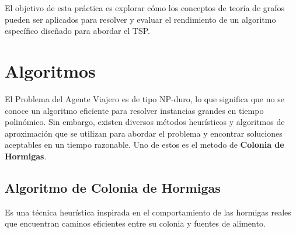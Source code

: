 \documentclass[]{report}
\begin{document}
	El objetivo de esta práctica es explorar cómo los conceptos de teoría de grafos pueden ser aplicados para resolver y evaluar el rendimiento de un algoritmo específico diseñado para abordar el TSP.
	\section{Algoritmos}
	El Problema del Agente Viajero es de tipo NP-duro, lo que significa que no se conoce un algoritmo eficiente para resolver instancias grandes en tiempo polinómico. Sin embargo, existen diversos métodos heurísticos y algoritmos de aproximación que se utilizan para abordar el problema y encontrar soluciones aceptables en un tiempo razonable. Uno de estos es el metodo de \textbf{Colonia de Hormigas}.
	
	\subsection{Algoritmo de Colonia de Hormigas}
	Es una técnica heurística inspirada en el comportamiento de las hormigas reales que encuentran caminos eficientes entre su colonia y fuentes de alimento. 
	
\end{document}
